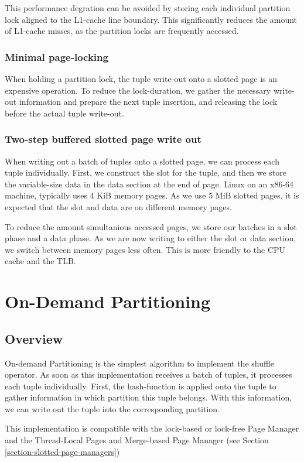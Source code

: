 This performance degration can be avoided by storing each individual partition lock aligned to the L1-cache line boundary.
This significantly reduces the amount of L1-cache misses, as the partition locks are frequently accessed.

\subsubsection{Minimal page-locking}
When holding a partition lock, the tuple write-out onto a slotted page is an expensive operation.
To reduce the lock-duration, we gather the necessary write-out information and prepare the next tuple insertion, and releasing the lock before the actual tuple write-out.

\subsubsection{Two-step buffered slotted page write out}
When writing out a batch of tuples onto a slotted page, we can process each tuple individually.
First, we construct the slot for the tuple, and then we store the variable-size data in the data section at the end of page.
Linux on an x86-64 machine, typically uses 4 KiB memory pages.
As we use 5 MiB slotted pages, it is expected that the slot and data are on different memory pages.

To reduce the amount simultanious accessed pages, we store our batches in a slot phase and a data phase.
As we are now writing to either the slot or data section, we switch between memory pages less often.
This is more friendly to the \ac{CPU} cache and the \ac{TLB}.

\section{On-Demand Partitioning} \label{section-On-Demand-Partitioning}
\subsection{Overview}
On-demand Partitioning is the simplest algorithm to implement the shuffle operator.
As soon as this implementation receives a batch of tuples, it processes each tuple individually.
First, the hash-function is applied onto the tuple to gather information in which partition this tuple belongs.
With this information, we can write out the tuple into the corresponding partition.

This implementation is compatible with the lock-based or lock-free Page Manager and the Thread-Local Pages and Merge-based Page Manager (see Section \ref{section-slotted-page-managers})

